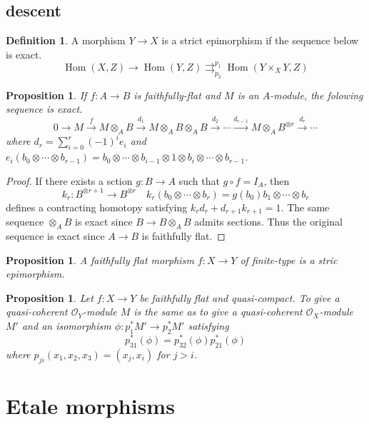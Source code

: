 \documentclass[leqno]{amsart}
\newcommand{\oo}{\mathcal O}
\newcommand{\1}{\mathbf{1}}
\DeclareMathOperator{\Hom}{Hom}
\newtheorem{prop}[thm]{Proposition}
\theoremstyle{definition}
\newtheorem{defn}[thm]{Definition}
\theoremstyle{remark}
\begin{document}
\subsection{descent}

\begin{defn}
	A morphism $Y\to X$
	is a strict epimorphism if the sequence below is exact.
	 \[
		 \Hom(X,Z)\to \Hom(Y,Z)
		 \rightrightarrows_{p_2}^{p_1}
		 \Hom(Y\times_XY,Z)
	\]
\end{defn}

\begin{prop}
	If $f\colon A\to B$ is faithfully-flat
	and $M$ is an  $A$-module,
	the folowing sequence is exact.
	\[
		0\to M\xrightarrow{f}
		M\otimes_AB\xrightarrow{d_1}
		M\otimes_AB\otimes_AB\xrightarrow{d_2}\cdots
		\xrightarrow{d_{r-1}} 
		M\otimes_AB^{\otimes r}\xrightarrow{d_r}\cdots
	\]
	where 
	$d_r=\sum_{i=0}^r (-1)^ie_i$ and
	$e_i(b_0\otimes\cdots\otimes b_{r-1})=
	b_0\otimes\cdots\otimes b_{i-1}\otimes 1\otimes b_i\otimes\cdots\otimes b_{r-1}$.
\end{prop}
\begin{proof}
	If there exists a sction $g\colon B\to A$
	such that  $g\circ f=I_A$, then
	 \[
		 k_r\colon B^{\otimes r+1}\to B^{\otimes r}\quad
		 k_r(b_0\otimes\cdots\otimes b_{r})
		 =g(b_0)b_1\otimes\cdots\otimes b_{r}
	\]
	defines a contracting homotopy
	satisfying $k_{r}d_{r}+d_{r+1}k_{r+1}=1$.
	The same sequence $\otimes_AB$
	is exact since  $B\to B\otimes_AB$ 
	admits sections.
	Thus the original sequence is exact 
	since $A\to B$ is faithfully flat.
\end{proof}

\begin{prop}
	A faithfully flat morphism
	$f\colon X\to Y$
	of finite-type is 
	a stric epimorphism.
\end{prop}
\begin{prop}
	Let $f\colon X\to Y$ be faithfully flat and quasi-compact.
	To give a quasi-coherent $\oo_Y$-module  $M$
	is the same as to give a quasi-coherent  $\oo_X$-module
	 $M'$ and an isomorphism  $\phi\colon p_1^*M'\to p_2^*M'$ 
	 satisfying
	 \[
		 p_{31}^*(\phi)=
		 p_{32}^*(\phi)
		 p_{21}^*(\phi)
	 \]
	 where $p_{ji}(x_1,x_2,x_3)=(x_j,x_i)$ for $j>i$.
\end{prop}

\section{Etale morphisms}
\end{document}
